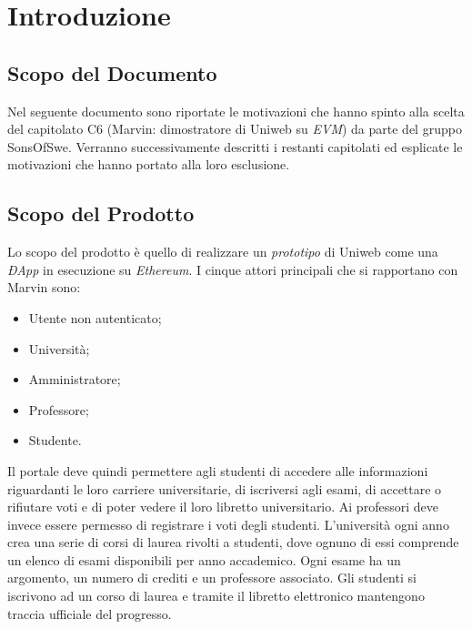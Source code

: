 \section{Introduzione}
\subsection{Scopo del Documento}
	Nel seguente documento sono riportate le motivazioni che hanno spinto alla scelta del capitolato C6 (Marvin: dimostratore di Uniweb su \textit{EVM}) da parte del gruppo SonsOfSwe. Verranno successivamente descritti i restanti capitolati ed esplicate le motivazioni che hanno portato alla loro esclusione.
	
\subsection{Scopo del Prodotto}
	\begin{comment}
	Il progetto Marvin si pone l'obiettivo di realizzare un sottoinsieme di funzionalità del portale Uniweb come una \textit{ÐApp}\ped{G} (Decentralized Applications, cioè applicazioni  che usano \textit{smart contracts}\ped{G}) in esecuzione su EVM.
	\end{comment}
	Lo scopo del prodotto è quello di realizzare un \emph{prototipo} di Uniweb come una \emph{ÐApp} in esecuzione su \emph{Ethereum}. I cinque attori principali che si rapportano con Marvin sono:
	\begin{itemize}
		\item Utente non autenticato; 
		\item Università;
		\item Amministratore;
		\item Professore;
		\item Studente.
	\end{itemize} 
	Il portale deve quindi permettere agli studenti di accedere alle informazioni riguardanti le loro carriere universitarie, di iscriversi agli esami, di accettare o rifiutare voti e di poter vedere il loro libretto universitario.
	Ai professori deve invece essere permesso di registrare i voti degli studenti.
	L'università ogni anno crea una serie di corsi di laurea rivolti a studenti, dove ognuno di essi comprende un elenco di esami disponibili per anno accademico. Ogni esame ha un argomento, un numero di crediti e un professore associato. Gli studenti si iscrivono ad un corso di laurea e tramite il libretto elettronico mantengono traccia ufficiale del progresso.
	
